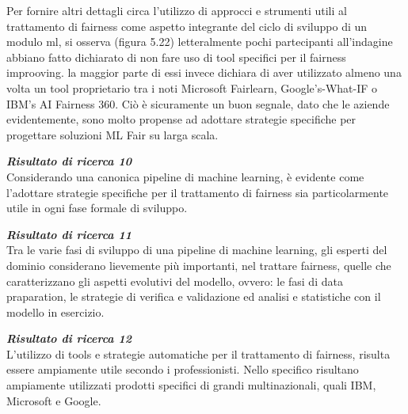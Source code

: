     Per fornire altri dettagli circa l'utilizzo di approcci e strumenti utili al trattamento di fairness come aspetto integrante del ciclo di sviluppo di un modulo ml, si osserva (figura 5.22) letteralmente pochi partecipanti all'indagine abbiano fatto dichiarato di non fare uso di tool specifici per il fairness improoving. la maggior parte di essi invece dichiara di aver utilizzato almeno una volta un tool proprietario tra i noti Microsoft Fairlearn, Google's-What-IF o IBM's AI Fairness 360. Ciò è sicuramente un buon segnale, dato che le aziende evidentemente, sono molto propense ad adottare strategie specifiche per progettare soluzioni ML Fair su larga scala.
    
    \begin{center}
	
        \begin{tcolorbox}[width=\textwidth, colframe=black, colback=Gray]
    			\begin{minipage}{\textwidth}
    				\textit{\faKey  \textbf{ Risultato di ricerca 10}}\\
    		     Considerando una canonica pipeline di machine learning, è evidente come l'adottare strategie specifiche per il trattamento di fairness sia particolarmente utile in ogni fase formale di sviluppo.
    			\end{minipage}
		\end{tcolorbox}
	\end{center}
	
	\begin{center}
	
        \begin{tcolorbox}[width=\textwidth, colframe=black, colback=Gray]
    			\begin{minipage}{\textwidth}
    				\textit{\faKey  \textbf{ Risultato di ricerca 11}}\\
    		     Tra le varie fasi di sviluppo di una pipeline di machine learning, gli esperti del dominio considerano lievemente più importanti, nel trattare fairness, quelle che caratterizzano gli aspetti evolutivi del modello, ovvero: le fasi di data praparation, le strategie di verifica e validazione ed analisi e statistiche con il modello in esercizio.
    			\end{minipage}
		\end{tcolorbox}
	\end{center}
	
	\begin{center}
	
        \begin{tcolorbox}[width=\textwidth, colframe=black, colback=Gray]
    			\begin{minipage}{\textwidth}
    				\textit{\faKey  \textbf{ Risultato di ricerca 12}}\\
    		     L'utilizzo di tools e strategie automatiche per il trattamento di fairness, risulta essere ampiamente utile secondo i professionisti. Nello specifico risultano ampiamente utilizzati prodotti specifici di grandi multinazionali, quali IBM, Microsoft e Google.
    			\end{minipage}
		\end{tcolorbox}
	\end{center}
	
